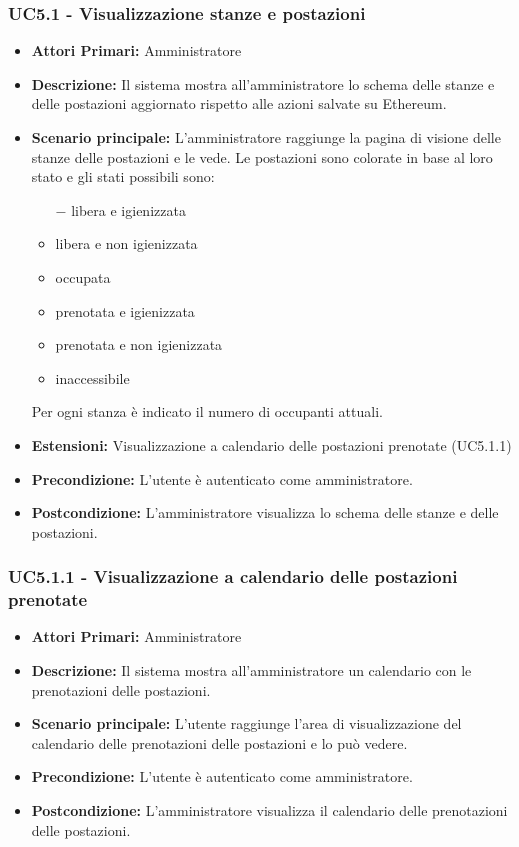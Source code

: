 \subsubsection{ UC5.1 - Visualizzazione stanze e postazioni}
\begin{itemize}
	\item\textbf{Attori Primari:}
	Amministratore
	\item\textbf{Descrizione:}
	Il sistema mostra all'amministratore lo schema delle stanze e delle postazioni aggiornato rispetto alle azioni salvate su Ethereum.
	\item\textbf{Scenario principale:}
	L'amministratore raggiunge la pagina di visione delle stanze delle postazioni e le vede. Le postazioni sono colorate in base al loro stato e gli stati possibili sono:
	\begin{itemize}
		\item[$-$] libera e igienizzata
		\item{libera e non igienizzata}
		\item{occupata}
		\item{prenotata e igienizzata}
		\item{prenotata e non igienizzata}
		\item{inaccessibile}
	\end{itemize}
	Per ogni stanza è indicato il numero di occupanti attuali.
	\item\textbf{Estensioni:}
	Visualizzazione a calendario delle postazioni prenotate (UC5.1.1)
	\item\textbf{Precondizione:} 
	L'utente è autenticato come amministratore.
	\item\textbf{Postcondizione:}
	L'amministratore visualizza lo schema delle stanze e delle postazioni.
\end{itemize}

\subsubsection{ UC5.1.1 - Visualizzazione a calendario delle postazioni prenotate}
\begin{itemize}
	\item\textbf{Attori Primari:}
	Amministratore
	\item\textbf{Descrizione:}
	Il sistema mostra all'amministratore un calendario con le prenotazioni delle postazioni.
	\item\textbf{Scenario principale:}
	L'utente raggiunge l'area di visualizzazione del calendario delle prenotazioni delle postazioni e lo può vedere.
	\item\textbf{Precondizione:} 
	L'utente è autenticato come amministratore.
	\item\textbf{Postcondizione:}
	L'amministratore visualizza il calendario delle prenotazioni delle postazioni.
\end{itemize}

